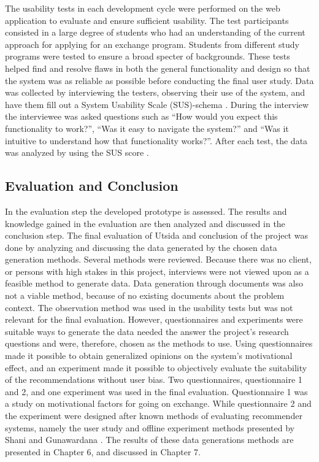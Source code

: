 The usability tests in each development cycle were performed on the web application to evaluate and ensure sufficient usability. The test participants consisted in a large degree of students who had an understanding of the current approach for applying for an exchange program. Students from different study programs were tested to ensure a broad specter of backgrounds. These tests helped find and resolve flaws in both the general functionality and design so that the system was as reliable as possible before conducting the final user study. Data was collected by interviewing the testers, observing their use of the system, and have them fill out a System Usability Scale (SUS)-schema \cite{brooke1996sus}. During the interview the interviewee was asked questions such as \enquote{How would you expect this functionality to work?}, \enquote{Was it easy to navigate the system?} and \enquote{Was it intuitive to understand how that functionality works?}. After each test, the data was analyzed by using the SUS score \cite{brooke1996sus}.

\subsection{Evaluation and Conclusion}

In the evaluation step the developed prototype is assessed. The results and knowledge gained in the evaluation are then analyzed and discussed in the conclusion step. The final evaluation of Utsida and conclusion of the project was done by analyzing and discussing the data generated by the chosen data generation methods. Several methods were reviewed. Because there was no client, or persons with high stakes in this project, interviews were not viewed upon as a feasible method to generate data. Data generation through documents was also not a viable method, because of no existing documents about the problem context. The observation method was used in the usability tests but was not relevant for the final evaluation. However, questionnaires and experiments were suitable ways to generate the data needed the answer the project's research questions and were, therefore, chosen as the methods to use. Using questionnaires made it possible to obtain generalized opinions on the system's motivational effect, and an experiment made it possible to objectively evaluate the suitability of the recommendations without user bias. Two questionnaires, questionnaire 1 and 2, and one experiment was used in the final evaluation. Questionnaire 1 was a study on motivational factors for going on exchange. While questionnaire 2 and the experiment were designed after known methods of evaluating recommender systems, namely the user study and offline experiment methods presented by Shani and Gunawardana \cite{shani2011evaluating}. The results of these data generations methods are presented in Chapter 6, and discussed in Chapter 7. 

